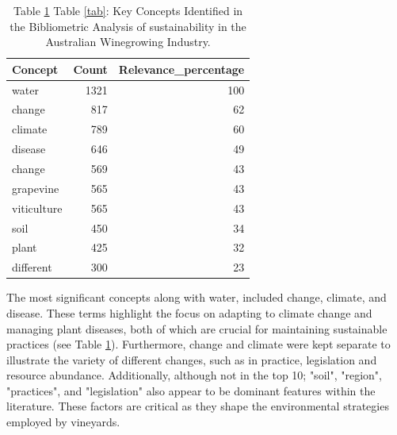 
\begin{table}[h]\label{tab:lexi}
    \caption{Table \ref{tab:lexi} Table \ref{tab}: Key Concepts Identified in the Bibliometric Analysis of sustainability in the Australian Winegrowing Industry.}
    \begin{tabular}{@{}lrr@{}}
    \toprule
    \textbf{Concept} & \multicolumn{1}{l}{\textbf{Count}} & \multicolumn{1}{l}{\textbf{Relevance_percentage}} \\ \midrule
    water & 1321 & 100 \\
    change & 817 & 62 \\
    climate & 789 & 60 \\
    disease & 646 & 49 \\
    change & 569 & 43 \\ %
    grapevine & 565 & 43 \\
    viticulture & 565 & 43 \\
    soil & 450 & 34 \\
    plant & 425 & 32 \\
    different & 300 & 23 \\ \bottomrule
    \end{tabular}
    \end{table}

% 

The most significant concepts along with water, included change, climate, and disease. These terms highlight the focus on adapting to climate change and managing plant diseases, both of which are crucial for maintaining sustainable practices (see Table \ref{tab:lexi}). Furthermore, change and climate were kept separate to illustrate the variety of different changes, such as in practice, legislation and resource abundance. Additionally, although not in the top 10; "soil", "region", "practices", and "legislation" also appear to be dominant features within the literature. These factors are critical as they shape the environmental strategies employed by vineyards.

